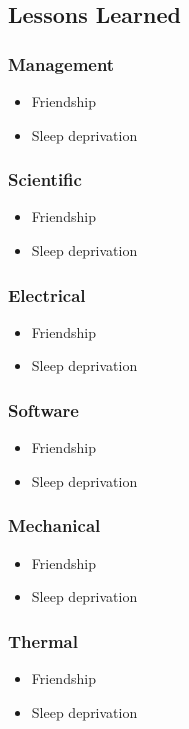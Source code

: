 \pagebreak
\subsection{Lessons Learned}

\subsubsection{Management}

\begin{itemize}
    \item Friendship
    \item Sleep deprivation
\end{itemize}

\subsubsection{Scientific}

\begin{itemize}
    \item Friendship
    \item Sleep deprivation
\end{itemize}



\subsubsection{Electrical}
 
\begin{itemize}
    \item Friendship
    \item Sleep deprivation
\end{itemize}


\subsubsection{Software }

\begin{itemize}
    \item Friendship
    \item Sleep deprivation
\end{itemize}



\subsubsection{Mechanical }

\begin{itemize}
    \item Friendship
    \item Sleep deprivation
\end{itemize}


\subsubsection{Thermal }
\begin{itemize}
    \item Friendship
    \item Sleep deprivation
\end{itemize}
